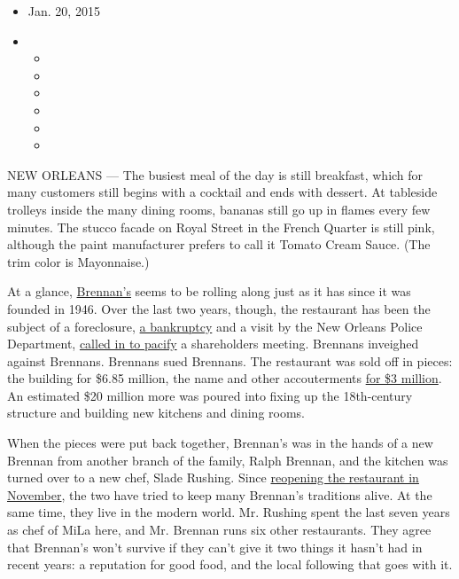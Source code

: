 \begin{itemize}
\item
  Jan. 20, 2015
\item
  \begin{itemize}
  \item
  \item
  \item
  \item
  \item
  \item
  \end{itemize}
\end{itemize}

NEW ORLEANS --- The busiest meal of the day is still breakfast, which
for many customers still begins with a cocktail and ends with dessert.
At tableside trolleys inside the many dining rooms, bananas still go up
in flames every few minutes. The stucco facade on Royal Street in the
French Quarter is still pink, although the paint manufacturer prefers to
call it Tomato Cream Sauce. (The trim color is Mayonnaise.)

At a glance, \href{http://www.brennansneworleans.com/}{Brennan's} seems
to be rolling along just as it has since it was founded in 1946. Over
the last two years, though, the restaurant has been the subject of a
foreclosure,
\href{http://www.nola.com/dining/index.ssf/2013/12/brennans_inc_former_owner_of_t.html}{a
bankruptcy} and a visit by the New Orleans Police Department,
\href{http://www.nola.com/dining/index.ssf/2013/05/family_battle_over_control_of.html}{called
in to pacify} a shareholders meeting. Brennans inveighed against
Brennans. Brennans sued Brennans. The restaurant was sold off in pieces:
the building for \$6.85 million, the name and other accouterments
\href{http://neworleanscitybusiness.com/blog/2014/07/10/brennans-to-reopen-after-bankruptcy-sale/}{for
\$3 million}. An estimated \$20 million more was poured into fixing up
the 18th-century structure and building new kitchens and dining rooms.

When the pieces were put back together, Brennan's was in the hands of a
new Brennan from another branch of the family, Ralph Brennan, and the
kitchen was turned over to a new chef, Slade Rushing. Since
\href{http://www.nola.com/dining/index.ssf/2014/11/brennans_restaurant_french_qua.html}{reopening
the restaurant in November}, the two have tried to keep many Brennan's
traditions alive. At the same time, they live in the modern world. Mr.
Rushing spent the last seven years as chef of MiLa here, and Mr. Brennan
runs six other restaurants. They agree that Brennan's won't survive if
they can't give it two things it hasn't had in recent years: a
reputation for good food, and the local following that goes with it.

